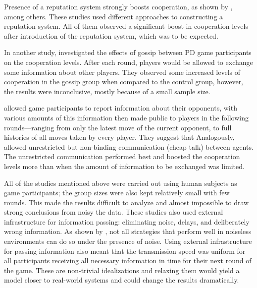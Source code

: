 \documentclass[english]{article}
\begin{document}
Presence of a reputation system strongly boosts cooperation, as shown by \citet{simple-reputation, dong-reputation}, among others.
These studies used different approaches to constructing a reputation system.
All of them observed a significant boost in cooperation levels after introduction of the reputation system, which was to be expected.

In another study, \citet{strangers-gossip} investigated the effects of gossip between PD game participants on the cooperation levels.
After each round, players would be allowed to exchange some information about other players.
They observed some increased levels of cooperation in the gossip group when compared to the control group, however, the results were inconclusive, mostly because of a small sample size.

\citet{public-private-monitoring} allowed game participants to report information about their opponents, with various amounts of this information then made public to players in the following rounds---ranging from only the latest move of the current opponent, to full histories of all moves taken by every player.
They suggest that 
Analogously, \citet{cooperation-communication} allowed unrestricted but non-binding communication (cheap talk) between agents. The unrestricted communication performed best and boosted the cooperation levels more than when the amount of information to be exchanged was limited.

All of the studies mentioned above were carried out using human subjects as game participants; the group sizes were also kept relatively small with few rounds.
This made the results difficult to analyze and almost impossible to draw strong conclusions from noisy the data.
These studies also used external infrastructure for information passing: eliminating noise, delays, and deliberately wrong information.
As shown by \citet{noise}, not all strategies that perform well in noiseless environments can do so under the presence of noise.
Using external infrastructure for passing information also meant that
the transmission speed was uniform for all participants receiving all necessary information in time for their next round of the game.
These are non-trivial idealizations and relaxing them would yield a model closer to real-world systems and could change the results dramatically.
\end{document}
